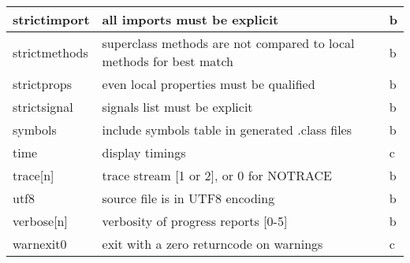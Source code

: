 \begin{longtable}[l]{|l|p{10cm}|l|}
\hline
 strictimport & all imports must be explicit &b \\
\hline
 strictmethods & superclass methods are not compared to local methods for best match &b \\
\hline
 strictprops  & even local properties must be qualified &b \\
\hline
 strictsignal & signals list must be explicit &b \\
\hline
 symbols      & include symbols table in generated .class files &b \\
\hline
 time         & display timings &c \\
\hline
 trace[n]     & trace stream [1 or 2], or 0 for NOTRACE &b \\
\hline
 utf8         & source file is in UTF8 encoding &b \\
\hline
 verbose[n]   & verbosity of progress reports [0-5] &b \\
\hline
 warnexit0    & exit with a zero returncode on warnings &c \\
\hline
\end{longtable}

